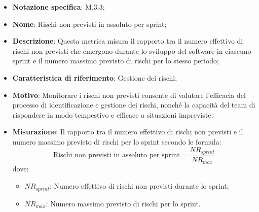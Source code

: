 \begin{itemize}
    \item \textbf{Notazione specifica}: M.3.3;
    \item \textbf{Nome}: Rischi non previsti in assoluto per sprint;
    \item \textbf{Descrizione}: Questa metrica misura il rapporto tra il numero effettivo di rischi non previsti che emergono durante lo sviluppo del software in ciascuno sprint e il numero massimo previsto di rischi per lo stesso periodo;
    \item \textbf{Caratteristica di riferimento}: Gestione dei rischi;
    \item \textbf{Motivo}: Monitorare i rischi non previsti consente di valutare l'efficacia del processo di identificazione e gestione dei rischi, nonché la capacità del team di rispondere in modo tempestivo e efficace a situazioni impreviste;
    \item \textbf{Misurazione}: Il rapporto tra il numero effettivo di rischi non previsti e il numero massimo previsto di rischi per lo sprint secondo le formula:
    \[
        \text{Rischi non previsti in assoluto per sprint} =\frac{NR_{sprint}}{NR_{max}} 
    \]
    dove:
    \begin{itemize}
        \item $NR_{sprint}$: Numero effettivo di rischi non previsti durante lo sprint;
        \item $NR_{max}$: Numero massimo previsto di rischi per lo sprint.
    \end{itemize}
\end{itemize}
